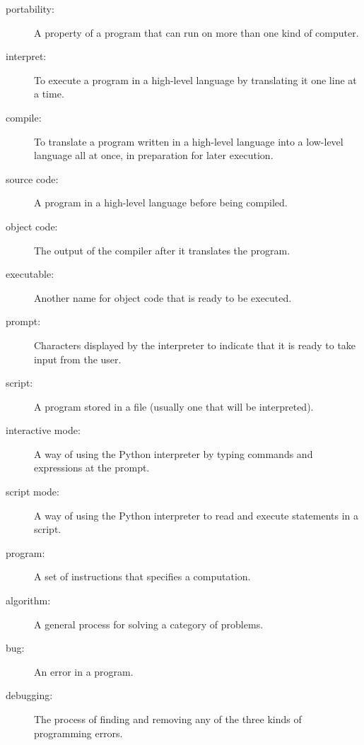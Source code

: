 \documentclass[10pt]{book}
\begin{document}
\begin{description}
\item[portability:]  A property of a program that can run on more
than one kind of computer.

\item[interpret:]  To execute a program in a high-level language
by translating it one line at a time.

\item[compile:]  To translate a program written in a high-level language
into a low-level language all at once, in preparation for later
execution.

\item[source code:]  A program in a high-level language before
being compiled.

\item[object code:]  The output of the compiler after it translates
the program.

\item[executable:]  Another name for object code that is ready
to be executed.

\item[prompt:] Characters displayed by the interpreter to indicate
that it is ready to take input from the user.

\item[script:] A program stored in a file (usually one that will be
interpreted).

\item[interactive mode:] A way of using the Python interpreter by
typing commands and expressions at the prompt.

\item[script mode:] A way of using the Python interpreter to read
and execute statements in a script.

\item[program:] A set of instructions that specifies a computation.

\item[algorithm:]  A general process for solving a category of
problems.

\item[bug:]  An error in a program.

\item[debugging:]  The process of finding and removing any of the
three kinds of programming errors.


\end{description}
\end{document}
